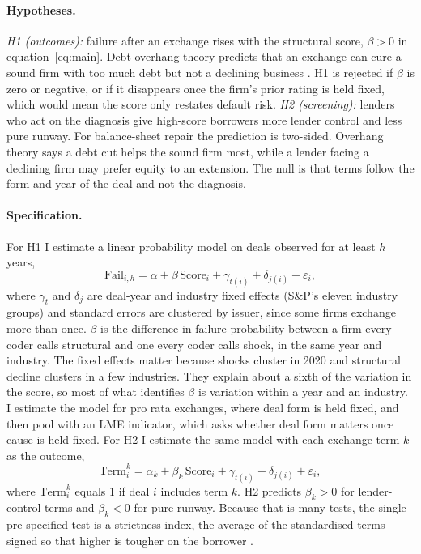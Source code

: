 \documentclass[12pt]{article}
\begin{document}
\paragraph{Hypotheses.} \emph{H1 (outcomes):} failure after an exchange rises with the structural score, $\beta > 0$ in equation~\eqref{eq:main}. Debt overhang theory predicts that an exchange can cure a sound firm with too much debt but not a declining business \citep{myers1977}. H1 is rejected if $\beta$ is zero or negative, or if it disappears once the firm's prior rating is held fixed, which would mean the score only restates default risk. \emph{H2 (screening):} lenders who act on the diagnosis give high-score borrowers more lender control and less pure runway. For balance-sheet repair the prediction is two-sided. Overhang theory says a debt cut helps the sound firm most, while a lender facing a declining firm may prefer equity to an extension. The null is that terms follow the form and year of the deal and not the diagnosis.

\paragraph{Specification.} For H1 I estimate a linear probability model on deals observed for at least $h$ years,
\begin{equation}
\text{Fail}_{i,h} = \alpha + \beta\,\text{Score}_i + \gamma_{t(i)} + \delta_{j(i)} + \varepsilon_i ,
\label{eq:main}
\end{equation}
where $\gamma_t$ and $\delta_j$ are deal-year and industry fixed effects (S\&P's eleven industry groups) and standard errors are clustered by issuer, since some firms exchange more than once. $\beta$ is the difference in failure probability between a firm every coder calls structural and one every coder calls shock, in the same year and industry. The fixed effects matter because shocks cluster in 2020 and structural decline clusters in a few industries. They explain about a sixth of the variation in the score, so most of what identifies $\beta$ is variation within a year and an industry. I estimate the model for pro rata exchanges, where deal form is held fixed, and then pool with an LME indicator, which asks whether deal form matters once cause is held fixed. For H2 I estimate the same model with each exchange term $k$ as the outcome,
\begin{equation}
\text{Term}^{k}_{i} = \alpha_k + \beta_k\,\text{Score}_i + \gamma_{t(i)} + \delta_{j(i)} + \varepsilon_i ,
\label{eq:h2}
\end{equation}
where $\text{Term}^{k}_{i}$ equals 1 if deal $i$ includes term $k$. H2 predicts $\beta_k > 0$ for lender-control terms and $\beta_k < 0$ for pure runway. Because that is many tests, the single pre-specified test is a strictness index, the average of the standardised terms signed so that higher is tougher on the borrower \citep{kling2007}.
\end{document}
